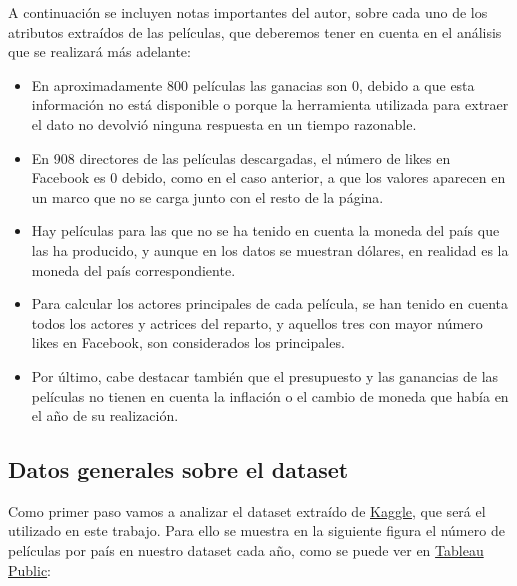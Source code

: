 \documentclass{article}
\begin{document}
A continuación se incluyen notas importantes del autor, sobre cada uno de los atributos extraídos de las películas, que deberemos  tener en cuenta en el análisis que se realizará más adelante:

\begin{itemize}
  \item En aproximadamente 800 películas las ganacias son 0, debido a que esta información no está disponible o porque la herramienta utilizada para extraer el dato no devolvió ninguna respuesta en un tiempo razonable.
  \item En 908 directores de las películas descargadas, el número de likes en Facebook es 0 debido, como en el caso anterior, a que los valores aparecen en un marco que no se carga junto con el resto de la página.
  \item Hay películas para las que no se ha tenido en cuenta la moneda del país que las ha producido, y aunque en los datos se muestran dólares, en realidad es la moneda del país correspondiente.
  \item Para calcular los actores principales de cada película, se han tenido en cuenta todos los actores y actrices del reparto, y aquellos tres con mayor número likes en Facebook, son considerados los principales.
  \item Por último, cabe destacar también que el presupuesto y las ganancias de las películas no tienen en cuenta la inflación o el cambio de moneda que había en el año de su realización.
\end{itemize}


\subsection{Datos generales sobre el dataset}

Como primer paso vamos a analizar el dataset extraído de \href{https://www.kaggle.com/deepmatrix/imdb-5000-movie-dataset}{Kaggle}, que será el utilizado en este trabajo. Para ello se muestra en la siguiente figura el número de películas por país en nuestro dataset cada año, como se puede ver en \href{https://public.tableau.com/profile/javier6580\#!/vizhome/proyecto_fin_de_master_dataset/films_per_year}{Tableau Public}:
\end{document}
